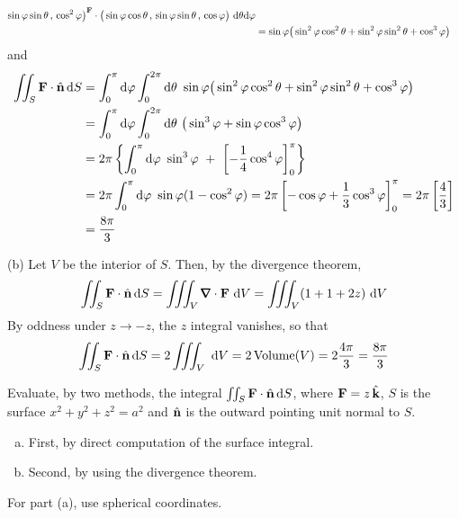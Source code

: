\begin{solution}
\begin{align*}
{          \sin\varphi\sin\theta\,,\,
          \cos^2\varphi\big)}^{\mathbf{F}}\cdot
      \big(\sin\varphi\cos\theta\,,\,
          \sin\varphi\sin\theta\,,\,
          \cos\varphi\big)\ \mathrm{d}\theta\mathrm{d}\varphi   \\
  &= \sin\varphi\big(\sin^2\varphi\cos^2\theta
             +\sin^2\varphi\sin^2\theta+\cos^3\varphi\big)
\end{align*}
and
\begin{align*}
\dblInt_S\vF\cdot\hn\,\dee{S}
&=\int_0^\pi \dee{\varphi}\int_0^{2\pi}\dee{\theta}\ \sin\varphi\big(\sin^2\varphi\cos^2\theta
+\sin^2\varphi\sin^2\theta+\cos^3\varphi\big)\cr
&=\int_0^\pi \dee{\varphi}\int_0^{2\pi}\dee{\theta}\ 
      \big(\sin^3\varphi + \sin\varphi\cos^3\varphi\big)\cr
&=2\pi \left\{\int_0^\pi \dee{\varphi}\ \sin^3\varphi
         \ +\ \left[-\frac{1}{4}\cos^4\varphi\right]^\pi_0 \right\}\cr
&=2\pi\int_0^\pi \dee{\varphi}\ \sin\varphi(1-\cos^2\varphi)
=2\pi\left[-\cos\varphi+\frac{1}{3}\cos^3\varphi\right]_0^\pi
=2\pi\left[\frac{4}{3}\right] \\
&=\frac{8\pi}{3}
\end{align*}

(b) Let $V$ be the interior of $S$. Then, by the divergence theorem,
\begin{equation*}
\dblInt_S\vF\cdot\hn\,\dee{S}
=\tripInt_V\vnabla\cdot\vF\ \dee{V}
=\tripInt_V(1+1+2z)\ \dee{V}
\end{equation*}
By oddness under $z\rightarrow -z$, the $z$ integral vanishes, so that
\begin{equation*}
\iint_S\mathbf{F}\cdot\hat{\mathbf{n}}\,\mathrm{d}S
=2\iiint_V\ \mathrm{d}V
=2\,\text{Volume}(V)
=2\frac{4\pi}{3}
=\frac{8\pi}{3}
\end{equation*}
\end{solution}


\begin{question}
 Evaluate, by two methods, the integral 
$\iint_S\mathbf{F}\cdot \hat{\mathbf{n}}\,\mathrm{d}S$, where $\mathbf{F}=z\,\hat{\mathbf{k}}$, 
$S$ is the surface $x^2+y^2+z^2=a^2$
and $\hat{\mathbf{n}}$ is the outward pointing unit normal to $S$.
\begin{enumerate}[(a)]
\item
First, by direct computation of the surface integral.
\item
Second, by using the divergence theorem.
\end{enumerate}
\end{question}

\begin{hint} 
For part (a), use spherical coordinates.
\end{hint}

